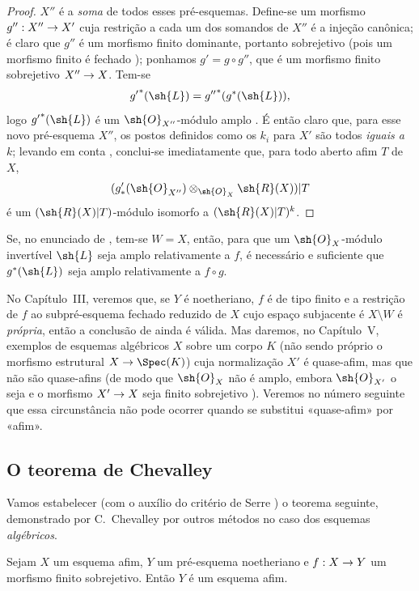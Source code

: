 \documentclass[oneside,10pt]{amsart}
\makeatletter
\newcommand{\ega@arrow}[2]{\mathchoice{#1}{#2}{#2}{#2}}
\renewcommand{\to}{\ega@arrow{\longrightarrow}{\rightarrow}}
\newcommand{\oldpage}[2][]{\marginnote{\normalfont\footnotesize\textbf{#1}~|~#2}\ignorespaces}
\let\EGAOriginalLabel\label
\renewcommand{\label}[1]{\phantomsection\EGAOriginalLabel{#1}}
\makeatother
\begin{document}
\begin{proof}
$X''$ é a \emph{soma} de todos esses pré-esquemas.
Define-se um morfismo $g'':X''\to X'$ cuja restrição a cada um dos somandos de $X''$ é a injeção canônica;
é claro que $g''$ é um morfismo finito dominante, portanto sobrejetivo (pois um morfismo finito é fechado );
ponhamos $g'=g\circ g''$, que é um morfismo finito sobrejetivo $X''\to X$.
Tem-se
\[
  {g'}^*(\sh{L})={g''}^*(g^*(\sh{L})),
\]
logo ${g'}^*(\sh{L})$ é um $\sh{O}_{X''}$-módulo amplo .
É então claro que, para esse novo pré-esquema $X''$, os postos definidos como os $k_i$ para $X'$ são todos \emph{iguais a $k$};
levando em conta , conclui-se imediatamente que, para todo aberto afim $T$ de $X$,
\[
  (g'_*(\sh{O}_{X''})\otimes_{\sh{O}_X}\sh{R}(X))|T
\]
é um $(\sh{R}(X)|T)$-módulo isomorfo a $(\sh{R}(X)|T)^k$.
\end{proof}

\begin{corollary}[6.6.12]
\label{II.6.6.12}
Se, no enunciado de , tem-se $W=X$, então, para que um $\sh{O}_X$-módulo invertível $\sh{L}$ seja amplo relativamente a $f$, é necessário e suficiente que $g^*(\sh{L})$ seja amplo relativamente a $f\circ g$.
\end{corollary}

\begin{remark}[6.6.13]
\label{II.6.6.13}
No Capítulo~III, veremos que, se $Y$ é noetheriano, $f$ é de tipo finito e a restrição de $f$ ao subpré-esquema fechado reduzido de $X$ cujo espaço subjacente é $X\setminus W$ é \emph{própria}, então a conclusão de  ainda é válida.
Mas daremos, no Capítulo~V, exemplos de esquemas algébricos $X$ sobre um corpo $K$ (não sendo próprio o morfismo estrutural $X\to\Spec(K)$) cuja normalização $X'$ é quase-afim, mas que não são quase-afins (de modo que $\sh{O}_X$ não é amplo, embora $\sh{O}_{X'}$ o seja  e o morfismo $X'\to X$ seja finito sobrejetivo ).
Veremos no número seguinte que essa circunstância não pode ocorrer quando se substitui «quase-afim» por «afim».
\end{remark}

\subsection{O teorema de Chevalley}
\label{subsection:II.6.7}

Vamos estabelecer (com o auxílio do critério de Serre ) o teorema seguinte, demonstrado por C.~Chevalley por outros métodos no caso dos esquemas \emph{algébricos}.
\oldpage[II]{136}
\begin{theorem}[6.7.1]
\label{II.6.7.1}
Sejam $X$ um esquema afim, $Y$ um pré-esquema noetheriano e $f:X\to Y$ um morfismo finito sobrejetivo.
Então $Y$ é um esquema afim.
\end{theorem}
\end{document}
